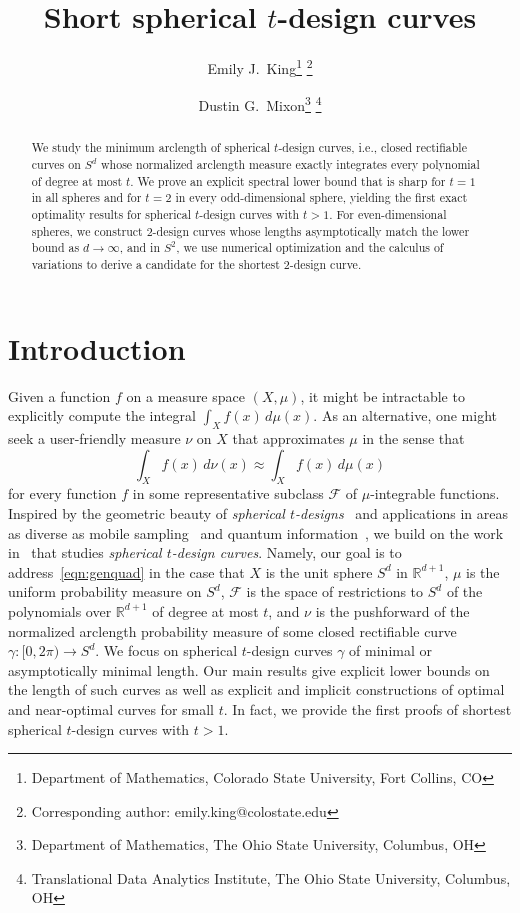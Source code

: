 \documentclass[12pt]{article}
\title{Short spherical $t$-design curves}
\author{Emily J.\ King\thanks{Department of Mathematics, Colorado State University, Fort Collins, CO} \thanks{Corresponding author: emily.king@colostate.edu}\and Dustin G.\ Mixon\thanks{Department of Mathematics, The Ohio State University, Columbus, OH} \thanks{Translational Data Analytics Institute, The Ohio State University, Columbus, OH}}
\date{}
\theoremstyle{plain}
\theoremstyle{definition}
\theoremstyle{remark}
\newcommand{\cF}{\mathcal{F}}
\newcommand{\bR}{\mathbb{R}}
\newcommand{\rar}{\rightarrow}
\begin{document}
\maketitle

\begin{abstract}
We study the minimum arclength of spherical $t$-design curves, i.e., closed rectifiable curves on $S^d$ whose normalized arclength measure exactly integrates every polynomial of degree at most $t$. 
We prove an explicit spectral lower bound that is sharp for $t=1$ in all spheres and for $t=2$ in every odd-dimensional sphere, yielding the first exact optimality results for spherical $t$-design curves with $t>1$. 
For even-dimensional spheres, we construct $2$-design curves whose lengths asymptotically match the lower bound as $d\to\infty$, and in $S^2$, we use numerical optimization and the calculus of variations to derive a candidate for the shortest $2$-design curve.
\end{abstract}

\section{Introduction}

  
Given a function $f$ on a measure space $(X,\mu)$, it might be intractable to explicitly compute the integral $\int_X f(x) \, d\mu(x)$.
As an alternative, one might seek a user-friendly measure $\nu$ on $X$ that approximates $\mu$ in the sense that
\begin{equation}\label{eqn:genquad}
     \int_X f(x) \, d\nu(x) \approx \int_X f(x) \, d\mu(x)
\end{equation}
for every function $f$ in some representative subclass $\cF$ of $\mu$-integrable functions.
Inspired by the geometric beauty of \emph{spherical $t$-designs}~\cite{McLaren:63,GoethalsS:79,Bannai:09} and applications in areas as diverse as mobile sampling~\cite{BenedettoW:00,GrochenigRUV:15,JamingNR:21,JayeM:22,UnnikrishnanV:13,UnnikrishnanV:13b,BoyerCCKW:16} and quantum information~\cite{XuWVA:25,PilatowskyCameoMCH:24,MarkSESCREC:24}, we build on the work in~\cite{EhlerG:23,EhlerGK:25,Ehler:25,EhlerG:25,Lindblad:24,Lindblad:25} that studies \emph{spherical $t$-design curves}.
Namely, our goal is to address~\eqref{eqn:genquad} in the case that $X$ is the unit sphere $S^d$ in $\bR^{d+1}$, $\mu$ is the uniform probability measure on $S^d$, $\cF$ is the space of restrictions to $S^d$ of the polynomials over $\bR^{d+1}$ of degree at most $t$, and $\nu$ is the pushforward of the normalized arclength probability measure of some closed rectifiable curve $\gamma\colon [0,2 \pi)\rar S^d$.
We focus on spherical $t$-design curves $\gamma$ of minimal or asymptotically minimal length.
Our main results give explicit lower bounds on the length of such curves as well as explicit and implicit constructions of optimal and near-optimal curves for small $t$.
In fact, we provide the first proofs of shortest spherical $t$-design curves with $t>1$.
\end{document}
